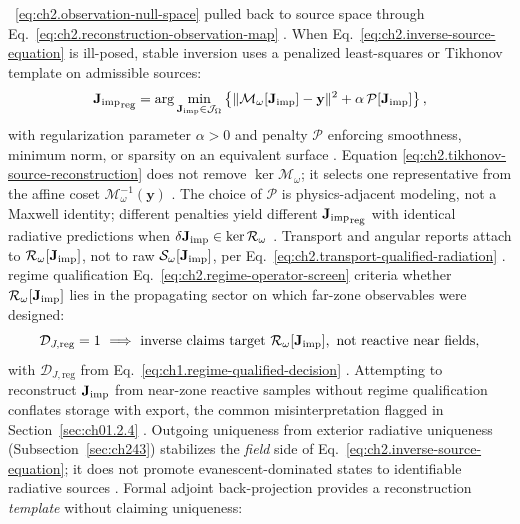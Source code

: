 ~\eqref{eq:ch2.observation-null-space} pulled back to source space through
Eq.~\eqref{eq:ch2.reconstruction-observation-map} \cite{stratton1941}. When Eq.~\eqref{eq:ch2.inverse-source-equation} is ill-posed, stable inversion uses
a penalized least-squares or Tikhonov template on admissible sources:
\begin{equation}
\label{eq:ch2.tikhonov-source-reconstruction}
{\mathbf{J}_{\mathrm{imp}}}_{\mathrm{reg}}
=
\arg\min_{\mathbf{J}_{\mathrm{imp}}\in\mathcal{J}_\Omega}
\left\{
\|\mathcal{M}_\omega[\mathbf{J}_{\mathrm{imp}}]-\mathbf{y}\|^{2}
+\alpha\,\mathcal{P}[\mathbf{J}_{\mathrm{imp}}]
\right\},
\end{equation}
with regularization parameter \(\alpha>0\) and penalty
\(\mathcal{P}\) enforcing smoothness, minimum norm, or sparsity on an equivalent
surface \cite{harrington2001}. Equation
\eqref{eq:ch2.tikhonov-source-reconstruction} does not remove
\(\ker\mathcal{M}_\omega\); it selects one representative from the affine coset
\(\mathcal{M}_\omega^{-1}(\mathbf{y})\) \cite{stratton1941}. The choice of
\(\mathcal{P}\) is physics-adjacent modeling, not a Maxwell identity; different
penalties yield different \({\mathbf{J}_{\mathrm{imp}}}_{\mathrm{reg}}\) with identical radiative
predictions when \(\delta\mathbf{J}_{\mathrm{imp}}\in\ker\mathcal{R}_\omega\) \cite{harrington2001}. Transport and angular reports attach to \(\mathcal{R}_\omega[\mathbf{J}_{\mathrm{imp}}]\), not to raw
\(\mathcal{S}_\omega[\mathbf{J}_{\mathrm{imp}}]\), per Eq.~\eqref{eq:ch2.transport-qualified-radiation}
\cite{stratton1941}. regime qualification Eq.~\eqref{eq:ch2.regime-operator-screen} criteria
whether \(\mathcal{R}_\omega[\mathbf{J}_{\mathrm{imp}}]\) lies in the propagating sector on which
far-zone observables were designed:
\begin{equation}
\label{eq:ch2.reconstruction-regime-criterion}
\mathcal{D}_{J,\mathrm{reg}}=1
\ \Longrightarrow\
\text{inverse claims target}\ \mathcal{R}_\omega[\mathbf{J}_{\mathrm{imp}}],
\ \text{not reactive near fields},
\end{equation}
with \(\mathcal{D}_{J,\mathrm{reg}}\) from Eq.~\eqref{eq:ch1.regime-qualified-decision}
\cite{stratton1941}. Attempting to reconstruct \(\mathbf{J}_{\mathrm{imp}}\) from
near-zone reactive samples without regime qualification conflates storage with export,
the common misinterpretation flagged in Section~\ref{sec:ch01.2.4} \cite{stratton1941}. Outgoing
uniqueness from exterior radiative uniqueness (Subsection~\ref{sec:ch243}) stabilizes the
\emph{field} side of Eq.~\eqref{eq:ch2.inverse-source-equation}; it does not promote
evanescent-dominated states to identifiable radiative sources
\cite{harrington2001}.
Formal adjoint back-projection provides a reconstruction \emph{template} without
claiming uniqueness:
